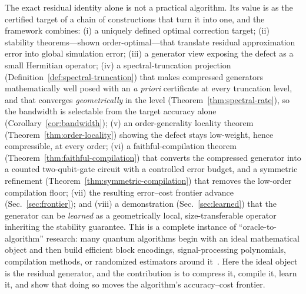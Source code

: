 \documentclass[aps,prresearch,reprint,superscriptaddress,nofootinbib,amsmath,amssymb]{revtex4-2}
\begin{document}
The exact residual identity alone is not a practical algorithm. Its value is as the certified target of a chain of constructions that turn it into one, and the framework combines: (i) a uniquely defined optimal correction target; (ii) stability theorems---shown order-optimal---that translate residual approximation error into global simulation error; (iii) a generator view exposing the defect as a small Hermitian operator; (iv) a spectral-truncation projection (Definition~\ref{def:spectral-truncation}) that makes compressed generators mathematically well posed with an \emph{a priori} certificate at every truncation level, and that converges \emph{geometrically} in the level (Theorem~\ref{thm:spectral-rate}), so the bandwidth is selectable from the target accuracy alone (Corollary~\ref{cor:bandwidth}); (v) an order-generality locality theorem (Theorem~\ref{thm:order-locality}) showing the defect stays low-weight, hence compressible, at every order; (vi) a faithful-compilation theorem (Theorem~\ref{thm:faithful-compilation}) that converts the compressed generator into a counted two-qubit-gate circuit with a controlled error budget, and a symmetric refinement (Theorem~\ref{thm:symmetric-compilation}) that removes the low-order compilation floor; (vii) the resulting error--cost frontier advance (Sec.~\ref{sec:frontier}); and (viii) a demonstration (Sec.~\ref{sec:learned}) that the generator can be \emph{learned} as a geometrically local, size-transferable operator inheriting the stability guarantee. This is a complete instance of ``oracle-to-algorithm'' research: many quantum algorithms begin with an ideal mathematical object and then build efficient block encodings, signal-processing polynomials, compilation methods, or randomized estimators around it~\cite{berry2015prl,low2017qsp,low2019qubitization,childs2022}. Here the ideal object is the residual generator, and the contribution is to compress it, compile it, learn it, and show that doing so moves the algorithm's accuracy--cost frontier.
\end{document}
